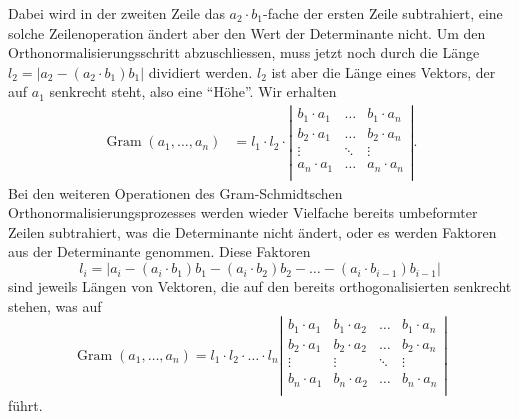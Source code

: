 Dabei wird in der zweiten Zeile das $a_2\cdot b_1$-fache der
ersten Zeile subtrahiert, eine solche Zeilenoperation ändert
aber den Wert der Determinante nicht.
Um den Orthonormalisierungsschritt abzuschliessen, muss jetzt
noch durch die Länge $l_2=|a_2-(a_2\cdot b_1)b_1|$ dividiert werden.
$l_2$ ist aber die Länge eines Vektors, der auf $a_1$ senkrecht steht,
also eine ``Höhe''.
Wir erhalten
\begin{align*}
\operatorname{Gram}(a_1,\dots,a_n)
&=
l_1 \cdot l_2 \cdot
\left|
\begin{matrix}
b_1\cdot a_1
		&\dots  &b_1\cdot a_n\\
b_2\cdot a_1
		&\dots  &b_2\cdot a_n\\
\vdots
		&\ddots &\vdots     \\
a_n \cdot a_1
		&\dots  &a_n\cdot a_n\\
\end{matrix}
\right|.
\end{align*}
Bei den weiteren Operationen des Gram-Schmidtschen
Orthonormalisierungsprozesses werden wieder Vielfache bereits
umbeformter Zeilen subtrahiert, was die Determinante nicht ändert,
oder es werden Faktoren aus der Determinante genommen.
Diese Faktoren
\[
l_i
=
|a_i - (a_i\cdot b_1)b_1 - (a_i\cdot b_2)b_2-\dots-(a_i\cdot b_{i-1})b_{i-1}|
\]
sind jeweils Längen von Vektoren, die auf den
bereits orthogonalisierten senkrecht stehen, was auf 
\[
\operatorname{Gram}(a_1,\dots,a_n)
=
l_1 \cdot l_2 \cdot\ldots\cdot l_n
\left|
\begin{matrix}
b_1\cdot a_1
	& b_1\cdot a_2
		&\dots  &b_1\cdot a_n\\
b_2\cdot a_1
	&b_2\cdot a_2
		&\dots  &b_2\cdot a_n\\
\vdots
	&\vdots
		&\ddots &\vdots     \\
b_n \cdot a_1
	&b_n\cdot a_2
		&\dots  &b_n\cdot a_n\\
\end{matrix}
\right|
\]
führt.

